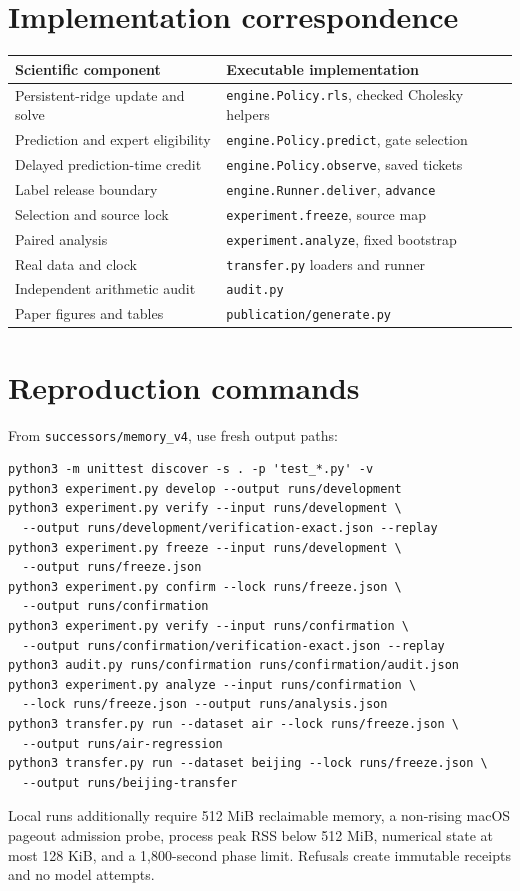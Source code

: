 \documentclass[10pt]{article}
\begin{document}
\section{Implementation correspondence}
\begin{tabular}{p{.31\linewidth}p{.61\linewidth}}
\toprule
Scientific component & Executable implementation\\
\midrule
Persistent-ridge update and solve & \texttt{engine.Policy.rls}, checked Cholesky helpers\\
Prediction and expert eligibility & \texttt{engine.Policy.predict}, gate selection\\
Delayed prediction-time credit & \texttt{engine.Policy.observe}, saved tickets\\
Label release boundary & \texttt{engine.Runner.deliver}, \texttt{advance}\\
Selection and source lock & \texttt{experiment.freeze}, source map\\
Paired analysis & \texttt{experiment.analyze}, fixed bootstrap\\
Real data and clock & \texttt{transfer.py} loaders and runner\\
Independent arithmetic audit & \texttt{audit.py}\\
Paper figures and tables & \texttt{publication/generate.py}\\
\bottomrule
\end{tabular}

\section{Reproduction commands}
From \texttt{successors/memory\_v4}, use fresh output paths:
\begin{verbatim}
python3 -m unittest discover -s . -p 'test_*.py' -v
python3 experiment.py develop --output runs/development
python3 experiment.py verify --input runs/development \
  --output runs/development/verification-exact.json --replay
python3 experiment.py freeze --input runs/development \
  --output runs/freeze.json
python3 experiment.py confirm --lock runs/freeze.json \
  --output runs/confirmation
python3 experiment.py verify --input runs/confirmation \
  --output runs/confirmation/verification-exact.json --replay
python3 audit.py runs/confirmation runs/confirmation/audit.json
python3 experiment.py analyze --input runs/confirmation \
  --lock runs/freeze.json --output runs/analysis.json
python3 transfer.py run --dataset air --lock runs/freeze.json \
  --output runs/air-regression
python3 transfer.py run --dataset beijing --lock runs/freeze.json \
  --output runs/beijing-transfer
\end{verbatim}
Local runs additionally require 512 MiB reclaimable memory, a non-rising macOS pageout admission probe, process peak RSS below 512 MiB, numerical state at most 128 KiB, and a 1,800-second phase limit. Refusals create immutable receipts and no model attempts.
\end{document}
